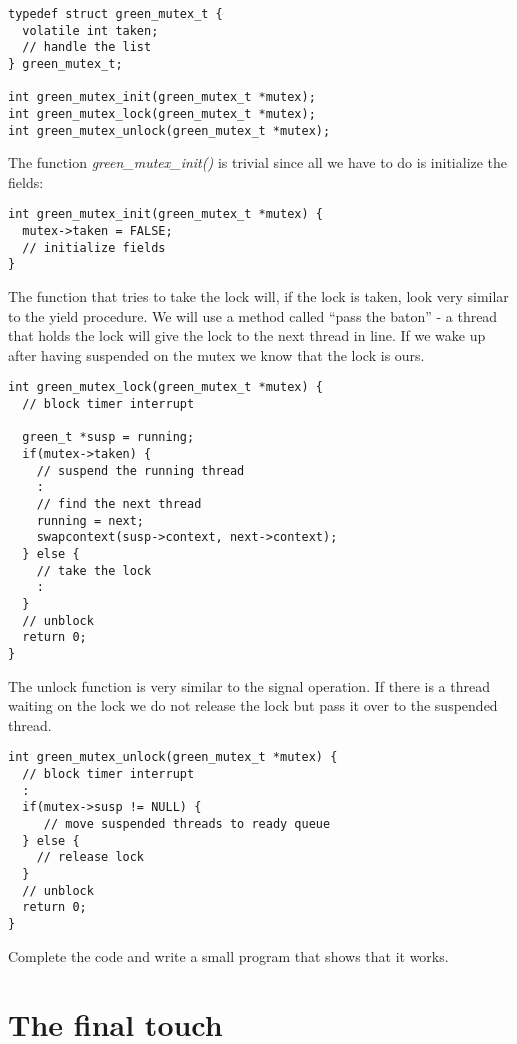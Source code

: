 \documentclass[a4paper,11pt]{article}
\begin{document}
\begin{lstlisting}
typedef struct green_mutex_t {
  volatile int taken;
  // handle the list 
} green_mutex_t;

int green_mutex_init(green_mutex_t *mutex);
int green_mutex_lock(green_mutex_t *mutex);
int green_mutex_unlock(green_mutex_t *mutex);
\end{lstlisting}

The function {\em green\_mutex\_init()} is trivial since all we have to
do is initialize the fields:

\begin{lstlisting}
int green_mutex_init(green_mutex_t *mutex) {
  mutex->taken = FALSE;
  // initialize fields
}
\end{lstlisting}

The function that tries to take the lock will, if the lock is taken,
look very similar to the yield procedure. We will use a method called
``pass the baton'' - a thread that holds the lock will give the lock
to the next thread in line. If we wake up after having suspended on
the mutex we know that the lock is ours.

\begin{lstlisting}
int green_mutex_lock(green_mutex_t *mutex) {
  // block timer interrupt

  green_t *susp = running;
  if(mutex->taken) {
    // suspend the running thread 
    :
    // find the next thread
    running = next;
    swapcontext(susp->context, next->context);
  } else {
    // take the lock
    :
  }
  // unblock
  return 0;
}
\end{lstlisting}

The unlock function is very similar to the signal operation. If there
is a thread waiting on the lock we do not release the lock but pass it
over to the suspended thread.

\begin{lstlisting}
int green_mutex_unlock(green_mutex_t *mutex) {
  // block timer interrupt
  :
  if(mutex->susp != NULL) {
     // move suspended threads to ready queue
  } else {
    // release lock
  }
  // unblock
  return 0;
}
\end{lstlisting}

Complete the code and write a small program that shows that it works.

\section{The final touch}
\end{document}
